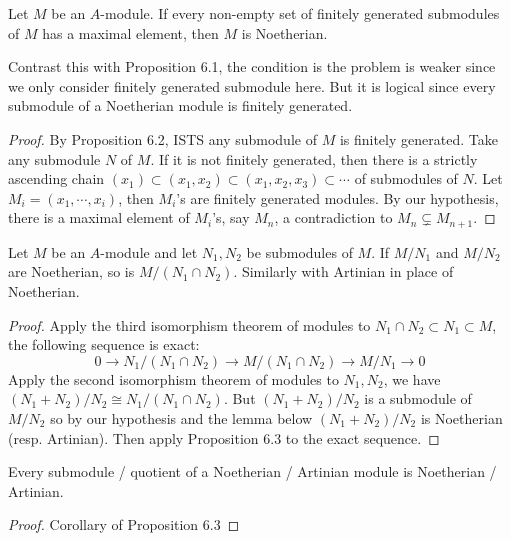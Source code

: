 \documentclass{solution}
\begin{document}
\begin{problem}
    Let $M$ be an $A$-module. If every non-empty set of finitely generated submodules of $M$ has a maximal element, then $M$ is Noetherian.
\end{problem}

{\color{red}Contrast this with Proposition 6.1, the condition is the problem is weaker since we only consider finitely generated submodule here. But it is logical since every submodule of a Noetherian module is finitely generated.}

\begin{proof}
    By Proposition 6.2, ISTS any submodule of $M$ is finitely generated. Take any submodule $N$ of $M$. If it is not finitely generated, then there is a strictly ascending chain $(x_1) \subset (x_1, x_2) \subset (x_1, x_2, x_3) \subset \cdots$ of submodules of $N$. Let $M_i = (x_1, \cdots, x_i)$, then $M_i$'s are finitely generated modules. By our hypothesis, there is a maximal element of $M_i$'s, say $M_n$, a contradiction to $M_n \subsetneq M_{n + 1}$. 
\end{proof}

\begin{problem}
    Let $M$ be an $A$-module and let $N_1, N_2$ be submodules of $M$. If $M / N_1$ and $M / N_2$ are Noetherian, so is $M / (N_1 \cap N_2)$. Similarly with Artinian in place of Noetherian.
\end{problem}

\begin{proof}
    Apply the third isomorphism theorem of modules to $N_1 \cap N_2 \subset N_1 \subset M$, the following sequence is exact:
    $$0 \rightarrow N_1 / (N_1 \cap N_2) \rightarrow M / (N_1 \cap N_2) \rightarrow M / N_1 \rightarrow 0$$
    Apply the second isomorphism theorem of modules to $N_1, N_2$, we have $(N_1 + N_2) / N_2 \cong N_1 / (N_1 \cap N_2)$. But $(N_1 + N_2) / N_2$ is a submodule of $M / N_2$ so by our hypothesis and the lemma below $(N_1 + N_2) / N_2$ is Noetherian (resp. Artinian). Then apply Proposition 6.3 to the exact sequence.
\end{proof}

\begin{lemma} \label{lem:sub-quotient-chain}
    Every submodule / quotient of a Noetherian / Artinian module is Noetherian / Artinian.
\end{lemma}

\begin{proof}
    Corollary of Proposition 6.3
\end{proof}
\end{document}

